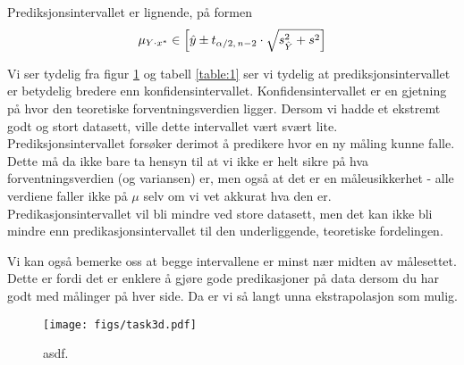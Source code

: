 \documentclass[12p,a4paper]{article}
\begin{document}
Prediksjonsintervallet er lignende, på formen
\begin{align*}
    \mu_{Y\cdot x^*} \in \qty[\hat{y} \pm t_{\alpha/2,\, n-2}\cdot \sqrt{s_{\hat{Y}}^2 + s^2}]
\end{align*}



Vi ser tydelig fra figur \ref{fig:5} og tabell \ref{table:1} ser vi tydelig at prediksjonsintervallet er betydelig bredere enn konfidensintervallet. Konfidensintervallet er en gjetning på hvor den teoretiske forventningsverdien ligger. Dersom vi hadde et ekstremt godt og stort datasett, ville dette intervallet vært svært lite. Prediksjonsintervallet forsøker derimot å predikere hvor en ny måling kunne falle. Dette må da ikke bare ta hensyn til at vi ikke er helt sikre på hva forventningsverdien (og variansen) er, men også at det er en måleusikkerhet - alle verdiene faller ikke på $\mu$ selv om vi vet akkurat hva den er. Predikasjonsintervallet vil bli mindre ved store datasett, men det kan ikke bli mindre enn predikasjonsintervallet til den underliggende, teoretiske fordelingen.

Vi kan også bemerke oss at begge intervallene er minst nær midten av målesettet. Dette er fordi det er enklere å gjøre gode predikasjoner på data dersom du har godt med målinger på hver side. Da er vi så langt unna ekstrapolasjon som mulig.

\begin{figure}[H]
    \centering
    \texttt{[image: figs/task3d.pdf]}
    \caption{asdf.}
    \label{fig:5}
\end{figure}
\end{document}
